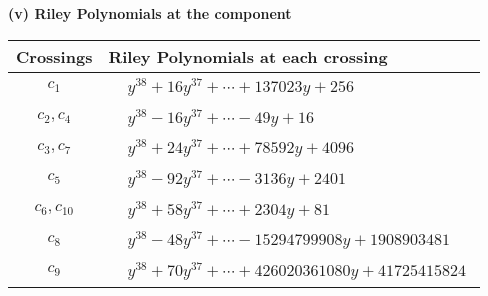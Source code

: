 \documentclass[1p]{elsarticle_modified}
\theoremstyle{definition}
\begin{document}
\newpage\renewcommand{\arraystretch}{1}
\flushleft \textbf{(v) Riley Polynomials at the component}\newline \\
\begin{tabular}{m{50pt}|m{274pt}}
Crossings & \hspace{64pt}Riley Polynomials at each crossing \\
\hline $$\begin{aligned}c_{1}\end{aligned}$$&$\begin{aligned}
&y^{38}+16 y^{37}+\cdots+137023 y+256
\end{aligned}$\\
\hline $$\begin{aligned}c_{2},c_{4}\end{aligned}$$&$\begin{aligned}
&y^{38}-16 y^{37}+\cdots-49 y+16
\end{aligned}$\\
\hline $$\begin{aligned}c_{3},c_{7}\end{aligned}$$&$\begin{aligned}
&y^{38}+24 y^{37}+\cdots+78592 y+4096
\end{aligned}$\\
\hline $$\begin{aligned}c_{5}\end{aligned}$$&$\begin{aligned}
&y^{38}-92 y^{37}+\cdots-3136 y+2401
\end{aligned}$\\
\hline $$\begin{aligned}c_{6},c_{10}\end{aligned}$$&$\begin{aligned}
&y^{38}+58 y^{37}+\cdots+2304 y+81
\end{aligned}$\\
\hline $$\begin{aligned}c_{8}\end{aligned}$$&$\begin{aligned}
&y^{38}-48 y^{37}+\cdots-15294799908 y+1908903481
\end{aligned}$\\
\hline $$\begin{aligned}c_{9}\end{aligned}$$&$\begin{aligned}
&y^{38}+70 y^{37}+\cdots+426020361080 y+41725415824
\end{aligned}$\\

\end{tabular}
\end{document}
